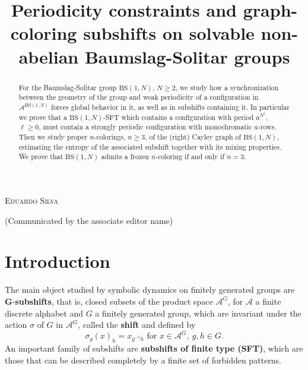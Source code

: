 \documentclass{aims}
\title[Periodicity and colorings on B.-S. groups] %
{Periodicity constraints and graph-coloring subshifts on solvable non-abelian Baumslag-Solitar groups}
\author[Eduardo Silva]{}
\newcommand{\BS}[1][N]{\mathrm{BS}(1,#1)}
\theoremstyle{definition}
\begin{document}
	\maketitle
	
	\centerline{\scshape Eduardo Silva}
	\bigskip
	
	\centerline{(Communicated by the associate editor name)}
	
	
	\begin{abstract}
For the Baumslag-Solitar group $\BS$, $N\ge 2$, we study how a synchronization between the geometry of the group and weak periodicity of a configuration in $\mathcal{A}^{\BS}$ forces global behavior in it, as well as in subshifts containing it. In particular we prove that a $\BS$-SFT which contains a configuration with period $a^{N^\ell}$, $\ell\ge 0$, must contain a strongly periodic configuration with monochromatic $a$-rows. Then we study proper $n$-colorings, $n\ge 3$, of the (right) Cayley graph of $\BS$, estimating the entropy of the associated subshift together with its mixing properties. We prove that $\BS$ admits a frozen $n$-coloring if and only if $n=3$.
	\end{abstract}
	
	\section{Introduction}
\label{section:introduction}
The main object studied by symbolic dynamics on finitely generated groups are $\mathbf{G}$-\textbf{subshifts}, that is, closed subsets of the product space $\mathcal{A}^G$, for $\mathcal{A}$ a finite discrete alphabet and $G$ a finitely generated group, which are invariant under the action $\sigma$ of $G$ in $\mathcal{A}^G$, called the \textbf{shift} and defined by
$$\sigma_g(x)_h=x_{g^{-1}h}\text{ for }x\in\mathcal{A}^G,\ g,h\in G.$$
An important family of subshifts are \textbf{subshifts of finite type (SFT)}, which are those that can be described completely by a finite set of forbidden patterns.
\end{document}
